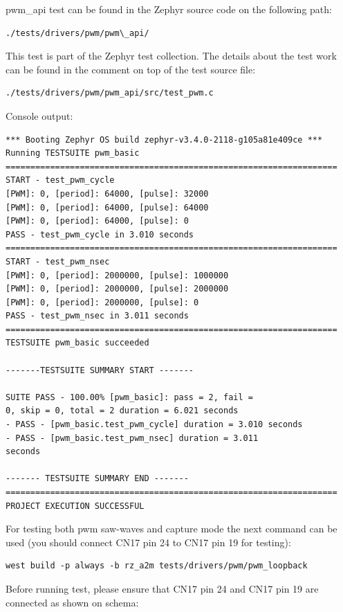 \documentclass[11pt,a4paper,oneside]{article}
\begin{document}
pwm\_api test can be found in the Zephyr source code on the following
path:

\begin{lstlisting}
./tests/drivers/pwm/pwm\_api/
\end{lstlisting}

This test is part of the Zephyr test collection. The details about the
test work can be found in the comment on top of the test source file:

\begin{lstlisting}
./tests/drivers/pwm/pwm_api/src/test_pwm.c
\end{lstlisting}

Console output:

\begin{lstlisting}
*** Booting Zephyr OS build zephyr-v3.4.0-2118-g105a81e409ce ***
Running TESTSUITE pwm_basic
===================================================================
START - test_pwm_cycle
[PWM]: 0, [period]: 64000, [pulse]: 32000
[PWM]: 0, [period]: 64000, [pulse]: 64000
[PWM]: 0, [period]: 64000, [pulse]: 0
PASS - test_pwm_cycle in 3.010 seconds
===================================================================
START - test_pwm_nsec
[PWM]: 0, [period]: 2000000, [pulse]: 1000000
[PWM]: 0, [period]: 2000000, [pulse]: 2000000
[PWM]: 0, [period]: 2000000, [pulse]: 0
PASS - test_pwm_nsec in 3.011 seconds
===================================================================
TESTSUITE pwm_basic succeeded

-------TESTSUITE SUMMARY START -------

SUITE PASS - 100.00% [pwm_basic]: pass = 2, fail =
0, skip = 0, total = 2 duration = 6.021 seconds
- PASS - [pwm_basic.test_pwm_cycle] duration = 3.010 seconds
- PASS - [pwm_basic.test_pwm_nsec] duration = 3.011
seconds

------- TESTSUITE SUMMARY END -------
===================================================================
PROJECT EXECUTION SUCCESSFUL
\end{lstlisting}

For testing both pwm saw-waves and capture mode the next command can be
used (you should connect CN17 pin 24 to CN17 pin 19 for testing):

\begin{lstlisting}
west build -p always -b rz_a2m tests/drivers/pwm/pwm_loopback
\end{lstlisting}

Before running test, please ensure that CN17 pin 24 and CN17 pin 19 are
connected as shown on schema:
\end{document}

